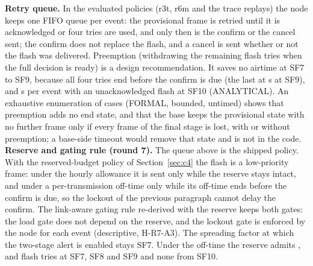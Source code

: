 \documentclass{ieeeaccess}
\begin{document}
\textbf{Retry queue.} In the evaluated policies (r3t, r6m and the trace replays) the node keeps one FIFO queue per event: the provisional frame is retried until it is acknowledged or four tries are used, and only then is the confirm or the cancel sent; the confirm does not replace the flash, and a cancel is sent whether or not the flash was delivered. Preemption (withdrawing the remaining flash tries when the full decision is ready) is a design recommendation. It saves no airtime at SF7 to SF9, because all four tries end before the confirm is due (the last at \PreemptEndNine{} s at SF9), and \PreemptSaveTen{} s per event with an unacknowledged flash at SF10 (ANALYTICAL). An exhaustive enumeration of \PreemptCases{} cases (FORMAL, bounded, untimed) shows that preemption adds no end state, and that the base keeps the provisional state with no further frame only if every frame of the final stage is lost, with or without preemption; a base-side timeout would remove that state and is not in the code.
\textbf{Reserve and gating rule (round 7).} The queue above is the shipped policy. With the reserved-budget policy of Section~\ref{sec:c4} the flash is a low-priority frame: under the hourly allowance it is sent only while the reserve stays intact, and under a per-transmission off-time only while its off-time ends before the confirm is due, so the lockout of the previous paragraph cannot delay the confirm. The link-aware gating rule re-derived with the reserve keeps both gates: the load gate does not depend on the reserve, and the lockout gate is enforced by the node for each event (descriptive, H-R7-A3). The spreading factor at which the two-stage alert is enabled stays SF7. Under the off-time the reserve admits \RsevTtenFlashTriesSfSeven{}, \RsevTtenFlashTriesSfEight{} and \RsevTtenFlashTriesSfNine{} flash tries at SF7, SF8 and SF9 and none from SF10.
\end{document}
